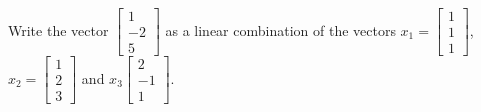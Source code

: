 \documentclass[final,expand]{problemset}
\begin{document}
\problem Write the vector $\begin{bmatrix}1 \\ -2 \\ 5\end{bmatrix}$ as a linear combination of the vectors $x_1 = \begin{bmatrix}1 \\ 1 \\ 1\end{bmatrix}$, $x_2 = \begin{bmatrix}1 \\ 2 \\ 3\end{bmatrix}$ and $x_3 \begin{bmatrix}2\\-1\\1\end{bmatrix}$.
\end{document}
